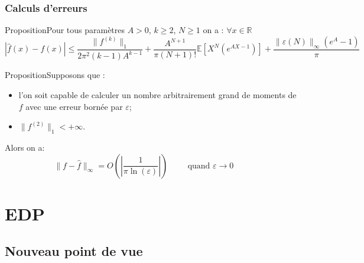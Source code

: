 \documentclass{beamer}
\newcommand{\prop}[1]{\begin{block}{Proposition}#1\end{block}}
\newcommand{\pth}[1]{\left(#1\right)}
\newcommand{\cro}[1]{\left[#1\right]}
\newcommand{\abs}[1]{\left|#1\right|}
\newcommand{\dabs}[1]{\|#1\|}
\newcommand{\comment}[1]{\hspace{1cm}\text{#1}\hspace{1cm}}
\newcommand{\Er}{\mathbb{R}}
\newcommand{\Esp}[1]{\mathbb{E}\cro{#1}}
\begin{document}
\begin{frame}
  \frametitle{Calculs d'erreurs}
    \prop{Pour tous paramètres $A>0$, $k\geqslant 2$, $N\geqslant 1$ on a : $\forall x\in\Er$ \[\textstyle\abs{\hat{f}(x)-f(x)}\leqslant\frac{\dabs{f^{(k)}}_1}{2\pi^2(k-1)A^{k-1}}+\frac{A^{N+1}}{\pi(N+1)!}\Esp{X^N(e^{AX-1})}+\frac{\dabs{\varepsilon(N)}_{\infty}(e^A-1)}{\pi}\]
    
    }
  \pause
  \prop{Supposons que :
    \begin{itemize}[label=$\bullet$]
    \item l'on soit capable de calculer un nombre arbitrairement grand de moments de $f$ avec une erreur bornée par $\varepsilon$;
    \item$\dabs{f^{(2)}}_1<+\infty$.
    \end{itemize}
    Alors on a:
    \[\dabs{f-\hat{f}}_{\infty}=O\pth{\abs{\frac{1}{\pi\ln(\varepsilon)}}}\comment{quand $\varepsilon\to 0$}\]
    }

\end{frame}

\section{EDP}

\begin{frame}
  \sectionpage
\end{frame}

\subsection{Nouveau point de vue}
\end{document}
